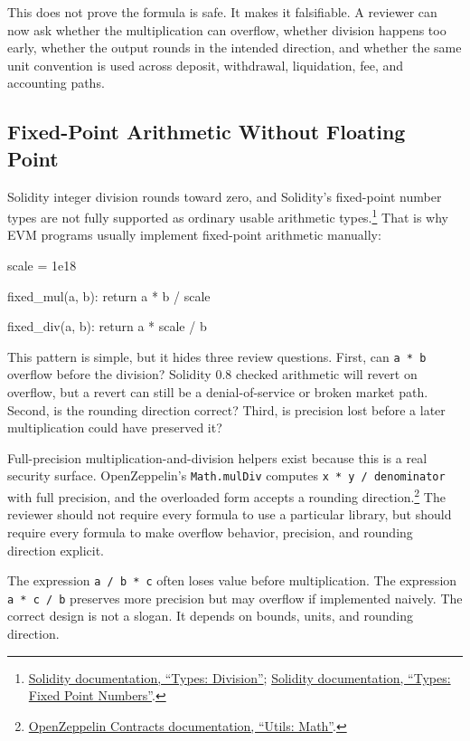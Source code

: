 This does not prove the formula is safe. It makes it falsifiable. A reviewer can now ask whether the multiplication can overflow, whether division happens too early, whether the output rounds in the intended direction, and whether the same unit convention is used across deposit, withdrawal, liquidation, fee, and accounting paths.

\subsection{Fixed-Point Arithmetic Without Floating Point}

Solidity integer division rounds toward zero, and Solidity's fixed-point number types are not fully supported as ordinary usable arithmetic types.\footnote{\href{https://docs.soliditylang.org/en/latest/types.html\#division}{Solidity documentation, ``Types: Division''}; \href{https://docs.soliditylang.org/en/latest/types.html\#fixed-point-numbers}{Solidity documentation, ``Types: Fixed Point Numbers''}.} That is why EVM programs usually implement fixed-point arithmetic manually:

\begin{codeblock}
scale = 1e18

fixed_mul(a, b):
    return a * b / scale

fixed_div(a, b):
    return a * scale / b
\end{codeblock}

This pattern is simple, but it hides three review questions. First, can \texttt{a * b} overflow before the division? Solidity 0.8 checked arithmetic will revert on overflow, but a revert can still be a denial-of-service or broken market path. Second, is the rounding direction correct? Third, is precision lost before a later multiplication could have preserved it?

Full-precision multiplication-and-division helpers exist because this is a real security surface. OpenZeppelin's \texttt{Math.mulDiv} computes \texttt{x * y / denominator} with full precision, and the overloaded form accepts a rounding direction.\footnote{\href{https://docs.openzeppelin.com/contracts/5.x/api/utils}{OpenZeppelin Contracts documentation, ``Utils: Math''}.} The reviewer should not require every formula to use a particular library, but should require every formula to make overflow behavior, precision, and rounding direction explicit.

\begin{failuremodebox}
The expression \texttt{a / b * c} often loses value before multiplication. The expression \texttt{a * c / b} preserves more precision but may overflow if implemented naively. The correct design is not a slogan. It depends on bounds, units, and rounding direction.
\end{failuremodebox}

